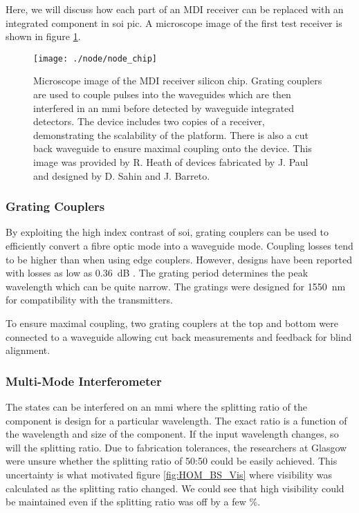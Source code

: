 Here, we will discuss how each part of an \ac{MDI} receiver can be replaced with an integrated component in \ac{soi} \ac{pic}. A microscope image of the first test receiver is shown in figure \ref{fig:node_chip}.

\begin{figure}[tbp]
	\centering
	\texttt{[image: ./node/node\_chip]}
	\caption[Silicon MDI-QKD receiver with waveguide integrated detectors]{Microscope image of the \ac{MDI} receiver silicon chip. Grating couplers are used to couple pulses into the waveguides which are then interfered in an \ac{mmi} before detected by waveguide integrated detectors. The device includes two copies of a receiver, demonstrating the scalability of the platform. There is also a cut back waveguide to ensure maximal coupling onto the device. This image was provided by R. Heath of devices fabricated by J. Paul and designed by D. Sahin and J. Barreto.}
	\label{fig:node_chip}
\end{figure}

\subsubsection*{Grating Couplers}

By exploiting the high index contrast of \ac{soi}, grating couplers can be used to efficiently convert a fibre optic mode into a waveguide mode. Coupling losses tend to be higher than when using edge couplers. However, designs have been reported with losses as low as \SI{0.36}{dB} \cite{Notaros2016}. The grating period determines the peak wavelength which can be quite narrow. The gratings were designed for \SI{1550}{nm} for compatibility with the transmitters.

To ensure maximal coupling, two grating couplers at the top and bottom were connected to a waveguide allowing cut back measurements and feedback for blind alignment. 

\subsubsection*{Multi-Mode Interferometer}

The states can be interfered on an \ac{mmi} where the splitting ratio of the component is design for a particular wavelength. The exact ratio is a function of the wavelength and size of the component. If the input wavelength changes, so will the splitting ratio. Due to fabrication tolerances, the researchers at Glasgow were unsure whether the splitting ratio of 50:50 could be easily achieved. This uncertainty is what motivated figure \ref{fig:HOM_BS_Vis} where visibility was calculated as the splitting ratio changed. We could see that high visibility could be maintained even if the splitting ratio was off by a few \%.

